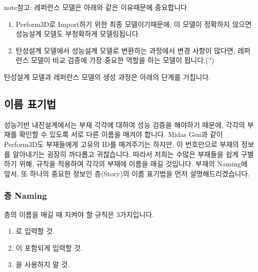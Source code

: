\documentclass[a4paper,10pt,korean]{sphinxmanual}
\begin{document}
\begin{sphinxadmonition}{note}{참고:}
\sphinxAtStartPar
레퍼런스 모델은 아래와 같은 이유때문에 중요합니다.
\begin{enumerate}
%
\item {} 
\sphinxAtStartPar
Perform\sphinxhyphen{}3D로 Import하기 위한 최종 모델이기때문에, 이 모델이 정확하지 않으면 성능설계 모델도 부정확하게 모델링됩니다.

\item {} 
\sphinxAtStartPar
탄성설계 모델에서 성능설계 모델로 변환하는 과정에서 변경 사항이 많다면, 레퍼런스 모델이 비교 검증에 가장 중요한 역할을 하는 모델이 됩니다.(?)

\end{enumerate}
\end{sphinxadmonition}

\sphinxAtStartPar
탄성설계 모델과 레퍼런스 모델의 생성 과정은 아래의 단계를 거칩니다.

\sphinxstepscope


\subsection{이름 표기법}
\label{\detokenize{2_naming_rules:id1}}\label{\detokenize{2_naming_rules::doc}}
\sphinxAtStartPar
성능기반 내진설계에서는 부재 각각에 대하여 성능 검증을 해야하기 때문에, 각각의 부재를 확인할 수 있도록 서로 다른 이름을 매겨야 합니다.
Midas Gen과 같이 Perform\sphinxhyphen{}3D도 부재들에게 고유의 ID를 매겨주기는 하지만, 이 번호만으로 부재의 정보를 알아내기는 굉장히 까다롭고 귀찮습니다.
따라서 저희는 수많은 부재들을 쉽게 구별하기 위해, 규칙을 적용하여 각각의 부재에 이름을 매길 것입니다.
부재의 Naming에 앞서, 또 하나의 중요한 정보인 층(Story)의 이름 표기법을 먼저 설명해드리겠습니다.


\subsubsection{층 Naming}
\label{\detokenize{2_naming_rules:naming}}
\sphinxAtStartPar
층의 이름을 매길 때 지켜야 할 규칙은 3가지입니다.
\begin{enumerate}
%
\item {} 
\sphinxAtStartPar
{} 로 입력할 것.

\item {} 
\sphinxAtStartPar
{} 이 포함되게 입력할 것.

\item {} 
\sphinxAtStartPar
{} 을 사용하지 말 것.

\end{enumerate}
\end{document}
